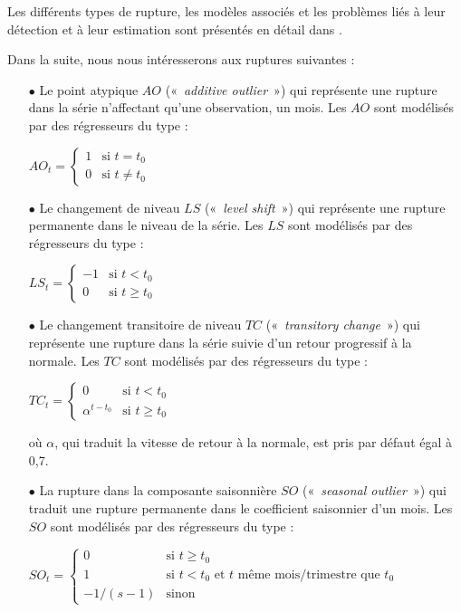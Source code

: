 \documentclass[12pt, a4paper, french]{article}
\begin{document}
Les différents types de rupture, les modèles associés et les problèmes liés à leur détection et à leur estimation sont présentés en détail dans \cite{Me2018}.

Dans la suite, nous nous intéresserons aux ruptures suivantes :
\begin{itemize}
	\item[$\bullet$] Le point atypique $AO$ («~\emph{additive outlier}~») qui représente une rupture dans la série n'affectant qu'une observation, un mois. Les $AO$ sont modélisés par des régresseurs du type : 
	
$
AO_{t} = \left\{ \begin{array}{cl} 
                1 & \mbox{si } t=t_{0} \\
                0 & \mbox{si } t\neq t_{0}
               \end{array}
       \right.
$
	\item[$\bullet$] Le changement de niveau $LS$ («~\emph{level shift}~») qui représente une rupture permanente dans le niveau de la série. Les $LS$ sont modélisés par des régresseurs du type : 
	
$
LS_{t} = \left\{ \begin{array}{rl} 
                -1 & \mbox{si } t<t_{0} \\
                0 & \mbox{si } t\geq t_{0}
               \end{array}
       \right.
$
	\item[$\bullet$] Le changement transitoire de niveau $TC$ («~\emph{transitory change}~») qui représente une rupture dans la série suivie d'un retour progressif à la normale. Les $TC$ sont modélisés par des régresseurs du type : 
	
$
TC_{t} = \left\{ \begin{array}{cl} 
                0 & \mbox{si } t<t_{0} \\
                \alpha^{t-t_{0}} & \mbox{si } t \geq t_{0}
               \end{array}
       \right.
$

où $\alpha$, qui traduit la vitesse de retour à la normale, est pris par défaut égal à 0,7.
	\item[$\bullet$] La rupture dans la composante saisonnière $SO$ («~\emph{seasonal outlier}~») qui traduit une rupture permanente dans le coefficient saisonnier d'un mois. Les $SO$ sont modélisés par des régresseurs du type : 
	
$			
SO_{t} = \left\{ \begin{array}{cl} 
                0 & \mbox{si } t \geq t_{0} \\
								1 & \mbox{si } t < t_{0} \mbox{ et } t  \mbox{ même mois/trimestre que } t_{0}\\
                -1/(s-1) & \mbox{sinon }
               \end{array}
       \right.		
$
\end{itemize}
\end{document}
